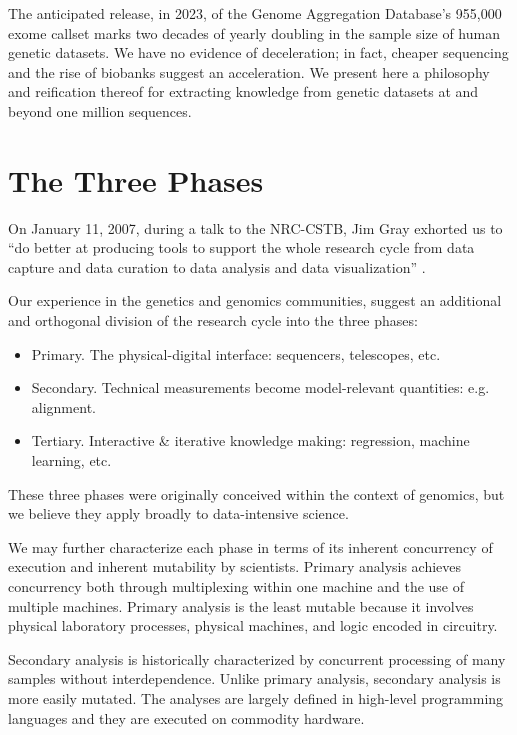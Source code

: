 \documentclass[10pt,a4paper%
]{article}
\begin{document}
The anticipated release, in 2023, of the Genome Aggregation Database's 955,000 exome callset marks two decades of yearly doubling in the sample size of human genetic datasets.
We have no evidence of deceleration; in fact, cheaper sequencing and the rise of biobanks suggest an acceleration.
We present here a philosophy and reification thereof for extracting knowledge from genetic datasets at and beyond one million sequences.

\section{The Three Phases}

On January 11, 2007, during a talk to the NRC-CSTB, Jim Gray exhorted us to ``do better at producing tools to support the whole research cycle from data capture and data curation to data analysis and data visualization'' \cite{fourth-paradigm}. %

Our experience in the genetics and genomics communities, suggest an additional and orthogonal division of the research cycle into the three phases:
\begin{itemize}
    \item Primary. The physical-digital interface: sequencers, telescopes, etc.
    \item Secondary. Technical measurements become model-relevant quantities: e.g. alignment.
    \item Tertiary. Interactive \& iterative knowledge making: regression, machine learning, etc.
\end{itemize}
These three phases were originally conceived within the context of genomics\cite{illumina-three-phases}, but we believe they apply broadly to data-intensive science.

We may further characterize each phase in terms of its inherent concurrency of execution and inherent mutability by scientists.
Primary analysis achieves concurrency both through multiplexing within one machine and the use of multiple machines.
Primary analysis is the least mutable because it involves physical laboratory processes, physical machines, and logic encoded in circuitry.

Secondary analysis is historically characterized by concurrent processing of many samples without interdependence.
Unlike primary analysis, secondary analysis is more easily mutated.
The analyses are largely defined in high-level programming languages and they are executed on commodity hardware.
\end{document}
